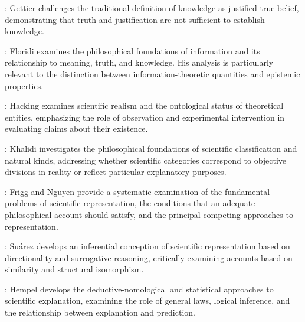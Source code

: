 
\cite{gettier1963justified}: Gettier challenges the traditional definition of knowledge as justified true belief, demonstrating that truth and justification are not sufficient to establish knowledge.


\cite{floridi2011philosophy}: Floridi examines the philosophical foundations of information and its relationship to meaning, truth, and knowledge. His analysis is particularly relevant to the distinction between information-theoretic quantities and epistemic properties.


\cite{hacking1983representing}: Hacking examines scientific realism and the ontological status of theoretical entities, emphasizing the role of observation and experimental intervention in evaluating claims about their existence.


\cite{khalidi2013natural}: Khalidi investigates the philosophical foundations of scientific classification and natural kinds, addressing whether scientific categories correspond to objective divisions in reality or reflect particular explanatory purposes.


\cite{frigg2020modelling}: Frigg and Nguyen provide a systematic examination of the fundamental problems of scientific representation, the conditions that an adequate philosophical account should satisfy, and the principal competing approaches to representation.


\cite{suarez2004inferential}: Suárez develops an inferential conception of scientific representation based on directionality and surrogative reasoning, critically examining accounts based on similarity and structural isomorphism.


\cite{hempel1965aspects}: Hempel develops the deductive-nomological and statistical approaches to scientific explanation, examining the role of general laws, logical inference, and the relationship between explanation and prediction.

